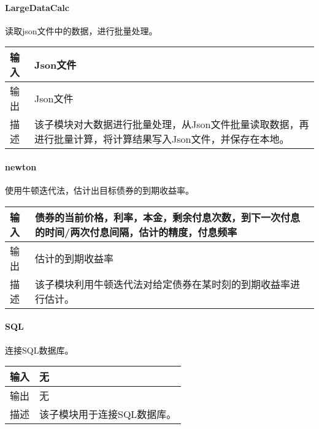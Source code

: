 \paragraph{LargeDataCalc}
读取json文件中的数据，进行批量处理。
\begin{table}[H]
\begin{adjustwidth}{-3cm}{-3cm}
\begin{center}
\begin{tabular}{|p{}| p{}|} \hline
输入 & Json文件  \\ \hline
输出 & Json文件 \\ \hline
描述 & 该子模块对大数据进行批量处理，从Json文件批量读取数据，再进行批量计算，将计算结果写入Json文件，并保存在本地。 \\ \hline
\end{tabular}
\end{center}
\end{adjustwidth}
\end{table}


\paragraph{newton}
使用牛顿迭代法，估计出目标债券的到期收益率。
\begin{table}[H]
\begin{adjustwidth}{-3cm}{-3cm}
\begin{center}
\begin{tabular}{|p{}| p{}|} \hline
输入 & 债券的当前价格，利率，本金，剩余付息次数，到下一次付息的时间/两次付息间隔，估计的精度，付息频率  \\ \hline
输出 & 估计的到期收益率 \\ \hline
描述 & 该子模块利用牛顿迭代法对给定债券在某时刻的到期收益率进行估计。 \\ \hline
\end{tabular}
\end{center}
\end{adjustwidth}
\end{table}


\paragraph{SQL}
连接SQL数据库。
\begin{table}[H]
\begin{adjustwidth}{-3cm}{-3cm}
\begin{center}
\begin{tabular}{|p{}| p{}|} \hline
输入 & 无  \\ \hline
输出 & 无 \\ \hline
描述 & 该子模块用于连接SQL数据库。 \\ \hline
\end{tabular}
\end{center}
\end{adjustwidth}
\end{table}



